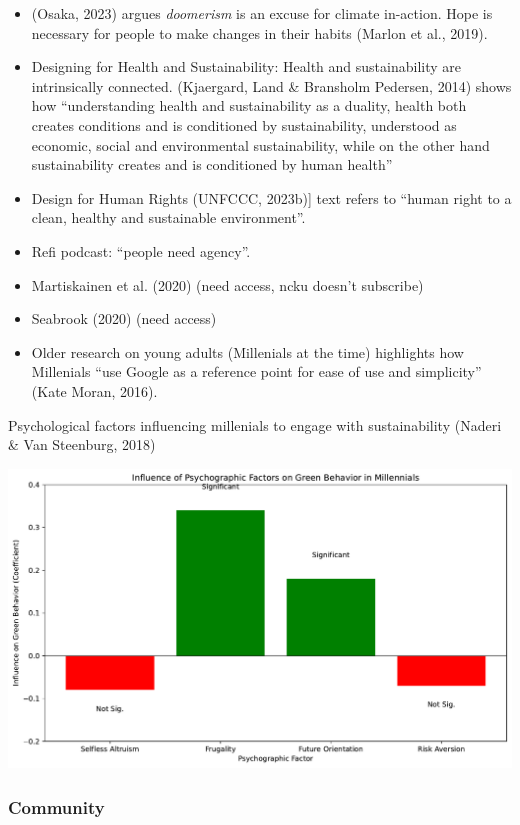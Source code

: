 \documentclass[
  letterpaper,
  DIV=11,
  numbers=noendperiod]{scrartcl}
\begin{document}
\begin{itemize}
\item
  (Osaka, 2023) argues \emph{doomerism} is an excuse for climate
  in-action. Hope is necessary for people to make changes in their
  habits (Marlon et al., 2019).
\item
  Designing for Health and Sustainability: Health and sustainability are
  intrinsically connected. (Kjaergard, Land \& Bransholm Pedersen, 2014)
  shows how ``understanding health and sustainability as a duality,
  health both creates conditions and is conditioned by sustainability,
  understood as economic, social and environmental sustainability, while
  on the other hand sustainability creates and is conditioned by human
  health''
\item
  Design for Human Rights (UNFCCC, 2023b){]} text refers to ``human
  right to a clean, healthy and sustainable environment''.
\item
  Refi podcast: ``people need agency''.
\item
  Martiskainen et al. (2020) (need access, ncku doesn't subscribe)
\item
  Seabrook (2020) (need access)
\item
  Older research on young adults (Millenials at the time) highlights how
  Millenials ``use Google as a reference point for ease of use and
  simplicity'' (Kate Moran, 2016).
\end{itemize}

Psychological factors influencing millenials to engage with
sustainability (Naderi \& Van Steenburg, 2018)

\includegraphics{_thesis_files/figure-pdf/cell-10-output-1.pdf}

\subsubsection{Community}\label{community}
\end{document}
